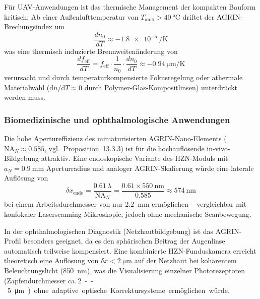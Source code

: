 ﻿\documentclass[12pt,a4paper]{article}
\theoremstyle{definition}
\newcommand{\eff}{\mathrm{eff}}
\begin{document}
	Für UAV-Anwendungen ist das thermische Management der
	kompakten Bauform kritisch: Ab einer Außenlufttemperatur von
	$T_\mathrm{amb} > \SI{40}{\degreeCelsius}$ driftet der
	AGRIN-Brechungsindex um
	\begin{equation}
		\frac{dn_0}{dT} \approx \SI{-1.8e-5}{\per\kelvin}
		\label{eq:dn_dt}
	\end{equation}
	was eine thermisch induzierte Brennweitenänderung von
	\begin{equation}
		\frac{df_\eff}{dT}
		= f_\eff\cdot\frac{1}{n_0}\cdot\frac{dn_0}{dT}
		\approx -\SI{0.94}{\micro\metre\per\kelvin}
		\label{eq:df_dt}
	\end{equation}
	verursacht und durch temperaturkompensierte Fokusregelung
	oder athermale Materialwahl ($\mathrm{d}n/\mathrm{d}T \approx 0$
	durch Polymer-Glas-Kompositlinsen) unterdrückt werden muss.

	\subsubsection{Biomedizinische und ophthalmologische Anwendungen}

	Die hohe Apertureffizienz des miniaturisierten AGRIN-Nano-Elements
	($\mathrm{NA}_N \approx 0.585$, vgl.\ Proposition~13.3.3) ist
	für die hochauflösende in-vivo-Bildgebung attraktiv.  Eine
	endoskopische Variante des HZN-Moduls mit $a_N = \SI{0.9}{\milli\metre}$
	Aperturradius und analoger AGRIN-Skalierung würde eine laterale
	Auflösung von
	\begin{equation}
		\delta x_\mathrm{endo}
		= \frac{0.61\,\lambda}{\mathrm{NA}_N}
		= \frac{0.61\times\SI{550}{\nano\metre}}{0.585}
		\approx \SI{574}{\nano\metre}
		\label{eq:endo_res}
	\end{equation}
	bei einem Arbeitsdurchmesser von nur \SI{2.2}{\milli\metre}
	ermöglichen -- vergleichbar mit konfokaler Laserscanning-Mikroskopie,
	jedoch ohne mechanische Scanbewegung.

	In der ophthalmologischen Diagnostik (Netzhautbildgebung) ist
	das AGRIN-Profil besonders geeignet, da es den sphärischen Beitrag
	der Augenlinse automatisch teilweise kompensiert.  Eine kombinierte
	HZN-Funduskamera erreicht theoretisch eine Auflösung von
	$\delta x < \SI{2}{\micro\metre}$ auf der Netzhaut bei kohärentem
	Beleuchtungslicht (\SI{850}{\nano\metre}), was die Visualisierung
	einzelner Photorezeptoren (Zapfendurchmesser ca.\,\SI{2}--\SI{5}{\micro\metre})
	ohne adaptive optische Korrektursysteme ermöglichen würde.
\end{document}
